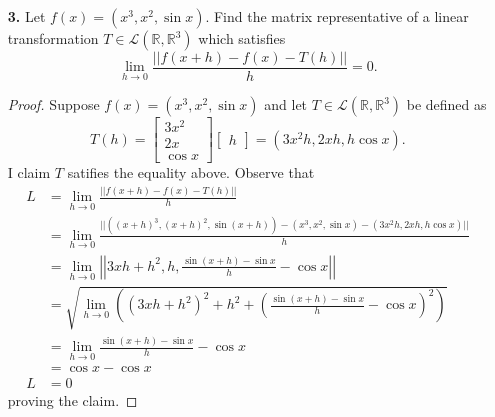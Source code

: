 \documentclass[ 12pt ]{article}
\begin{document}
\begin{enumerate}
\begin{proof}
			Provided that $T \in \mathcal{L}(\mathbb{R}^4, \mathbb{R}^5)$, we can apply Theorem 8.15 which provides $$T(x_1, x_2, x_3, x_4) =
			\begin{bmatrix}
				1 & 0 & 0 & 1 \\
				0 & 2 & -1 & 0 \\
				0 & 0 & 0 & 0 \\
				1 & 1 & 1 & -1 \\
				1 & 3 & 0 & 0
			\end{bmatrix}
			\begin{bmatrix} x_1 \\ x_2 \\ x_3 \\ x_4 \end{bmatrix}.$$
		\end{proof}

	\item[\textbf{3.}] Let $f(x) = (x^3, x^2, \sin x)$. Find the matrix representative of a linear transformation $T \in \mathcal{L}(\mathbb{R}, \mathbb{R}^3)$ which satisfies
		$$\lim_{h \to 0} \frac{||f(x + h) - f(x) - T(h)||}{h} = 0.$$

		\begin{proof}
			Suppose $f(x) = (x^3, x^2, \sin x)$ and let $T \in \mathcal{L}(\mathbb{R}, \mathbb{R}^3)$ be defined as $$T(h) = \begin{bmatrix} 3x^2 \\ 2x \\ \cos x \end{bmatrix}
			\begin{bmatrix} h \end{bmatrix} = (3x^2h, 2xh, h\cos x).$$ I claim $T$ satifies the equality above. Observe that
			\begin{align*}
				L &= \lim_{h \to 0} \frac{||f(x + h) - f(x) - T(h)||}{h} \\
				&= \lim_{h \to 0} \frac{||( (x + h)^3, (x + h)^2, \sin(x + h) ) - (x^3, x^2, \sin x) - (3x^2h, 2xh, h\cos x) ||}{h} \\
				&= \lim_{h \to 0} \left | \left | 3xh + h^2, h, \frac{\sin(x+h) - \sin x}{h} - \cos x \right | \right | \\
				&= \sqrt{\lim_{h \to 0} \left ( (3xh + h^2)^2 + h^2 + \left ( \frac{\sin(x+h) - \sin x}{h} - \cos x \right )^2 \right )} \\
				&= \lim_{h \to 0} \frac{\sin(x+h) - \sin x}{h} - \cos x \\
				&= \cos x - \cos x \\
				L &= 0
			\end{align*}
			proving the claim.
		\end{proof}



\end{enumerate}
\end{document}
